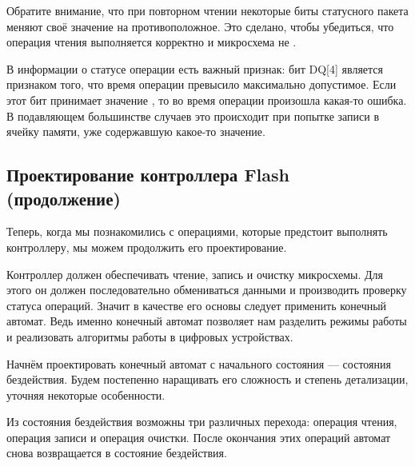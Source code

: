 \par{Обратите внимание, что при повторном чтении некоторые биты статусного пакета меняют своё значение на противоположное. Это сделано, чтобы убедиться, что операция чтения выполняется корректно и микросхема не .}
\par{В информации о статусе операции есть важный признак: бит DQ[4] является признаком того, что время операции превысило максимально допустимое. Если этот бит принимает значение , то во время операции произошла какая-то ошибка. В подавляющем большинстве случаев это происходит при попытке записи в ячейку памяти, уже содержавшую какое-то значение.}

\subsection{Проектирование контроллера Flash (продолжение)}
\par{Теперь, когда мы познакомились с операциями, которые предстоит выполнять контроллеру, мы можем продолжить его проектирование.}
\par{Контроллер должен обеспечивать чтение, запись и очистку микросхемы. Для этого он должен последовательно обмениваться данными и производить проверку статуса операций. Значит в качестве его основы следует применить конечный автомат. Ведь именно конечный автомат позволяет нам разделить режимы работы и реализовать алгоритмы работы в цифровых устройствах.}
\par{Начнём проектировать конечный автомат с начального состояния --- состояния бездействия. Будем постепенно наращивать его сложность и степень детализации, уточняя некоторые особенности.}

\par{Из состояния бездействия возможны три различных перехода: операция чтения, операция записи и операция очистки. После окончания этих операций автомат снова возвращается в состояние бездействия.}

